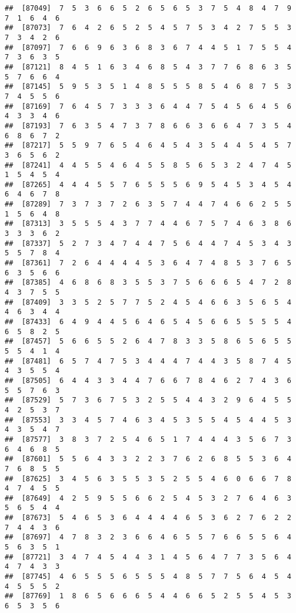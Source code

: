 \documentclass[
]{book}
\begin{document}
\begin{verbatim}
##  [87049]  7  5  3  6  6  5  2  6  5  6  5  3  7  5  4  8  4  7  9  7  1  6  4  6
##  [87073]  7  6  4  2  6  5  2  5  4  5  7  5  3  4  2  7  5  5  3  7  3  4  2  6
##  [87097]  7  6  6  9  6  3  6  8  3  6  7  4  4  5  1  7  5  5  4  7  3  6  3  5
##  [87121]  8  4  5  1  6  3  4  6  8  5  4  3  7  7  6  8  6  3  5  5  7  6  6  4
##  [87145]  5  9  5  3  5  1  4  8  5  5  5  8  5  4  6  8  7  5  3  7  4  5  5  6
##  [87169]  7  6  4  5  7  3  3  3  6  4  4  7  5  4  5  6  4  5  6  4  3  3  4  6
##  [87193]  7  6  3  5  4  7  3  7  8  6  6  3  6  6  4  7  3  5  4  6  8  6  7  2
##  [87217]  5  5  9  7  6  5  4  6  4  5  4  3  5  4  4  5  4  5  7  3  6  5  6  2
##  [87241]  4  4  5  5  4  6  4  5  5  8  5  6  5  3  2  4  7  4  5  1  5  4  5  4
##  [87265]  4  4  4  5  5  7  6  5  5  5  6  9  5  4  5  3  4  5  4  6  4  6  7  8
##  [87289]  7  3  7  3  7  2  6  3  5  7  4  4  7  4  6  6  2  5  5  1  5  6  4  8
##  [87313]  3  5  5  5  4  3  7  7  4  4  6  7  5  7  4  6  3  8  6  3  3  3  6  2
##  [87337]  5  2  7  3  4  7  4  4  7  5  6  4  4  7  4  5  3  4  3  5  5  7  8  4
##  [87361]  7  2  6  4  4  4  4  5  3  6  4  7  4  8  5  3  7  6  5  6  3  5  6  6
##  [87385]  4  6  8  6  8  3  5  5  3  7  5  6  6  6  5  4  7  2  8  4  3  7  5  5
##  [87409]  3  3  5  2  5  7  7  5  2  4  5  4  6  6  3  5  6  5  4  4  6  3  4  4
##  [87433]  6  4  9  4  4  5  6  4  6  5  4  5  6  6  5  5  5  5  4  6  5  8  2  5
##  [87457]  5  6  6  5  5  2  6  4  7  8  3  3  5  8  6  5  6  5  5  5  5  4  1  4
##  [87481]  6  5  7  4  7  5  3  4  4  4  7  4  4  3  5  8  7  4  5  4  3  5  5  4
##  [87505]  6  4  4  3  3  4  4  7  6  6  7  8  4  6  2  7  4  3  6  5  5  7  6  3
##  [87529]  5  7  3  6  7  5  3  2  5  5  4  4  3  2  9  6  4  5  5  4  2  5  3  7
##  [87553]  3  3  4  5  7  4  6  3  4  5  3  5  5  4  5  4  4  5  3  4  3  5  4  7
##  [87577]  3  8  3  7  2  5  4  6  5  1  7  4  4  4  3  5  6  7  3  6  4  6  8  5
##  [87601]  5  5  6  4  3  3  2  2  3  7  6  2  6  8  5  5  3  6  4  7  6  8  5  5
##  [87625]  3  4  5  6  3  5  5  3  5  2  5  5  4  6  0  6  6  7  8  4  7  4  5  5
##  [87649]  4  2  5  9  5  5  6  6  2  5  4  5  3  2  7  6  4  6  3  5  6  5  4  4
##  [87673]  5  4  6  5  3  6  4  4  4  4  6  5  3  6  2  7  6  2  2  7  4  4  3  6
##  [87697]  4  7  8  3  2  3  6  6  4  6  5  5  7  6  6  5  5  6  4  5  6  3  5  1
##  [87721]  3  4  7  4  5  4  4  3  1  4  5  6  4  7  7  3  5  6  4  4  7  4  3  3
##  [87745]  4  6  5  5  5  6  5  5  5  4  8  5  7  7  5  6  4  5  4  4  5  5  5  2
##  [87769]  1  8  6  5  6  6  6  5  4  4  6  6  5  2  5  5  4  5  3  6  5  3  5  6

\end{verbatim}
\end{document}
